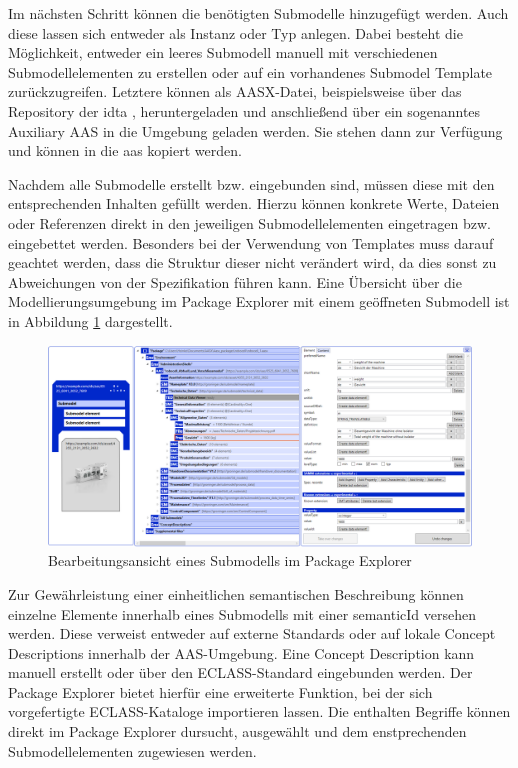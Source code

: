 Im nächsten Schritt können die benötigten Submodelle hinzugefügt werden. 
Auch diese lassen sich entweder als Instanz oder Typ anlegen.
Dabei besteht die Möglichkeit, entweder ein leeres Submodell manuell mit verschiedenen Submodellelementen zu erstellen oder auf ein vorhandenes Submodel Template zurückzugreifen.
Letztere können als AASX-Datei, beispielsweise über das Repository der \acs{idta} \cite{idtaTemplates}, heruntergeladen und anschließend über ein sogenanntes Auxiliary AAS in die Umgebung geladen werden.
Sie stehen dann zur Verfügung und können in die \acs{aas} kopiert werden.

Nachdem alle Submodelle erstellt bzw. eingebunden sind, müssen diese mit den entsprechenden Inhalten gefüllt werden.
Hierzu können konkrete Werte, Dateien oder Referenzen direkt in den jeweiligen Submodellelementen eingetragen bzw. eingebettet werden.
Besonders bei der Verwendung von Templates muss darauf geachtet werden, dass die Struktur dieser nicht verändert wird, da dies sonst zu Abweichungen von der Spezifikation führen kann.
Eine Übersicht über die Modellierungsumgebung im Package Explorer mit einem geöffneten Submodell ist in Abbildung \ref{fig:BearbeitungsansichtPackageExplorer} dargestellt.

\begin{figure}[htbp]
    \centering
    \includegraphics[width=1\textwidth]{Bilder/ModellierungAAS/neu.PNG}
    \caption{Bearbeitungsansicht eines Submodells im Package Explorer}
    \label{fig:BearbeitungsansichtPackageExplorer}
\end{figure}

Zur Gewährleistung einer einheitlichen semantischen Beschreibung können einzelne Elemente innerhalb eines Submodells mit einer semanticId versehen werden.
Diese verweist entweder auf externe Standards oder auf lokale Concept Descriptions innerhalb der AAS-Umgebung.
Eine Concept Description kann manuell erstellt oder über den ECLASS-Standard eingebunden werden.
Der Package Explorer bietet hierfür eine erweiterte Funktion, bei der sich vorgefertigte ECLASS-Kataloge importieren lassen.
Die enthalten Begriffe können direkt im Package Explorer dursucht, ausgewählt und dem enstprechenden Submodellelementen zugewiesen werden.

